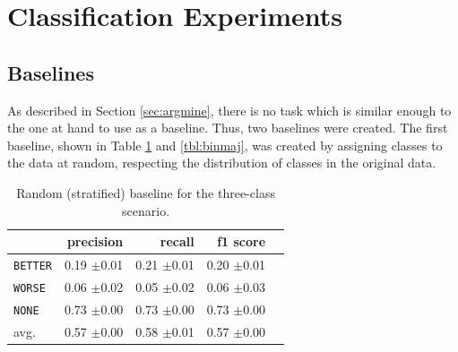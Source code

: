 \section{Classification Experiments}
\subsection{Baselines}
\label{sec:3_baseline}
As described in Section \ref{sec:argmine}, there is no task which is similar enough to the one at hand to use as a baseline. Thus, two baselines were created. 
The first baseline, shown in Table \ref{tbl:3stratifiedbaseline} and \ref{tbl:binmaj}, was created by assigning classes to the data at random, respecting the distribution of classes in the original data.  
\begin{table}[!htb]
	\begin{minipage}{.5\linewidth}
		\caption{Random (stratified) baseline for the three-class scenario.}
		\label{tbl:3stratifiedbaseline}
		\centering
		      
		\begin{tabularx}{0.97\linewidth}{Xrrrr}
			\toprule
			                & precision                    & recall                       & f1 score                     \\ \midrule 
			\texttt{BETTER} & 0.19 \scriptsize{$\pm$0.01} & 0.21 \scriptsize{$\pm$0.01} & 0.20 \scriptsize{$\pm$0.01} \\ 
			\texttt{WORSE}  & 0.06 \scriptsize{$\pm$0.02} & 0.05 \scriptsize{$\pm$0.02} & 0.06 \scriptsize{$\pm$0.03} \\ 
			\texttt{NONE}   & 0.73 \scriptsize{$\pm$0.00}  & 0.73 \scriptsize{$\pm$0.00} & 0.73 \scriptsize{$\pm$0.00} \\ 
			avg.         & 0.57 \scriptsize{$\pm$0.00} & 0.58 \scriptsize{$\pm$0.01} & 0.57 \scriptsize{$\pm$0.00} \\ 
			\bottomrule
		\end{tabularx} 
		

\end{minipage}
\end{table}
